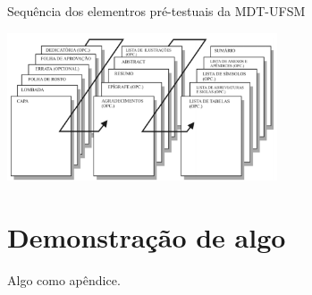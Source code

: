 \documentclass[oneside,openright,12pt]{ufsm_2015} %
\begin{document}
         \begin{ilustracao}[ht]
     	    \caption{\label{exepretex} Sequência dos elementros pré-testuais da MDT-UFSM}
	    \centering
	    \includegraphics[width=0.6\textwidth]{figuras/pretextuais.png}
	    \vspace{\baselineskip} %
         \end{ilustracao}




	
	
	
	\apendice %

\chapter{Demonstração de algo}
        \par Algo como apêndice.  

        
        
        
        \anexo    %
        
\end{document}
